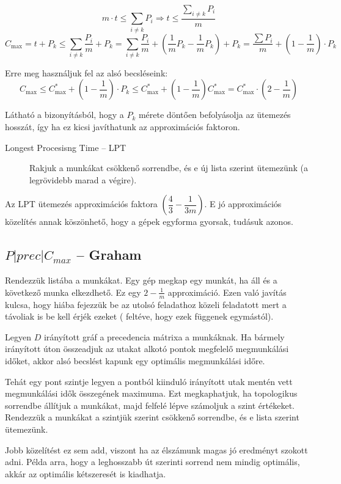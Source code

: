 \[ m \cdot t \leq \sum_{i \neq k}P_i \Rightarrow t \leq \frac{\sum\limits_{i \neq k}P_i}{m}
\]
\[ C_{\mbox{max}}=t+P_k \leq \sum_{i \neq  k} \frac{P_i}{m} + P_k = \sum_{i \neq
		k} \frac{P_i}{m} + \left(\frac{1}{m} P_k - \frac{1}{m} P_k\right) + P_k
	= \frac{\sum P_i}{m} + \left(1-\frac{1}{m}\right) \cdot P_k
\]

Erre meg használjuk fel az alsó becsléseink:
\[
	C_{\mbox{max}} \leq C^*_{\mbox{max}} + \left(1-\frac{1}{m}\right) \cdot P_k
	\leq C^*_{\mbox{max}} + \left(1-\frac{1}{m}\right) C^*_{\mbox{max}}
	=C^*_{\mbox{max}} \cdot \left(2-\frac{1}{m}\right)
\]

Látható a bizonyításból, hogy a $P_k$ mérete döntően befolyásolja az ütemezés
hosszát, így ha ez kicsi javíthatunk az approximációs faktoron.
\begin{description}
	\item[Longest Procesisng Time -- LPT ] Rakjuk a munkákat csökkenő
	      sorrendbe, és e új lista szerint ütemezünk (a legrövidebb marad a végire).
\end{description}

Az LPT ütemezés approximációs faktora $\left( \dfrac{4}{3} - \dfrac{1}{3m}
	\right)$. E jó approximációs közelítés annak köszönhető, hogy a gépek egyforma
gyorsak, tudásuk azonos.

\subsection{ \texorpdfstring{$ P|prec|C_{max} $} {P|prec|Cmax} -- Graham}

Rendezzük listába a munkákat. Egy gép megkap egy munkát, ha áll és a következő
munka elkezdhető. Ez egy $2-\frac{1}{m}$ approximáció. Ezen való javítás kulcsa,
hogy hiába fejezzük be az utolsó feladathoz közeli feladatott mert a távoliak is
be kell érjék ezeket ( feltéve, hogy ezek függenek egymástól).

Legyen $D$ irányított gráf a precedencia mátrixa a munkáknak. Ha bármely
irányított úton összeadjuk az utakat alkotó pontok megfelelő megmunkálási
időket, akkor alsó becslést kapunk egy optimális megmunkálási időre.

Tehát egy pont szintje legyen a pontból kiinduló irányított utak  mentén vett
megmunkálási idők összegének maximuma. Ezt megkaphatjuk, ha topologikus
sorrendbe állítjuk a munkákat, majd felfelé lépve számoljuk a szint értékeket.
Rendezzük a munkákat a szintjük szerint csökkenő sorrendbe, és e lista szerint
ütemezünk.

Jobb közelítést ez sem add, viszont ha az élszámunk magas jó eredményt szokott
adni. Példa arra, hogy a leghosszabb út szerinti sorrend nem mindig optimális,
akkár az optimális kétszeresét is kiadhatja.

